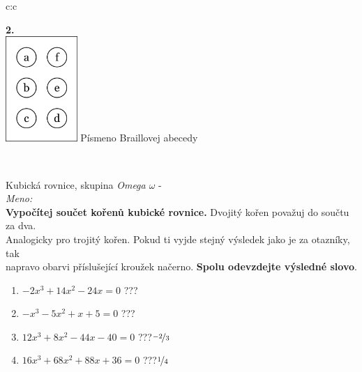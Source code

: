 \documentclass[10pt]{report}
\begin{document}
\begin{tabular}{c:c}
\begin{minipage}[c][99mm][t]{0.49\linewidth}
\begin{center}
\begin{minipage}{0.77\linewidth}
\begin{center}
\end{center}
\end{minipage}
\begin{minipage}{0.20\linewidth}
\begin{center}
{\Huge\bfseries 2.} \\[2mm]
\includegraphics[height=40mm]{../images/braille.png}
{\small Písmeno Braillovej abecedy}
\end{center}
\end{minipage}
\end{center}
\end{minipage}
\\ \hdashline
\begin{minipage}[c][99mm][t]{0.49\linewidth}
\begin{center}
\vspace{7mm}
{\huge Kubická rovnice, skupina \textit{Omega $\omega$} -}\\[4.5mm]
\textit{Meno:}\phantom{xxxxxxxxxxxxxxxxxxxxxxxxxxxxxxxxxxxxxxxxxxxxxxxxxxxxxxxxxxxxxxxxx}\\[3.5mm]
\textbf{Vypočítej součet kořenů kubické rovnice.} Dvojitý kořen považuj do součtu za dva.\\Analogicky pro trojitý kořen. Pokud ti vyjde stejný výsledek jako je za otazníky, tak\\napravo obarvi příslušející kroužek načerno. \textbf{Spolu odevzdejte výsledné slovo}.\\[3mm]
\begin{minipage}{0.77\linewidth}
\begin{center}
\begin{varwidth}{\textwidth}
\begin{enumerate}
\large
\item $-2x^3+14x^2-24x=0$\quad \dotfill\; ???\;\dotfill {}
\item $-x^3-5x^2+x+5=0$\quad \dotfill\; ???\;\dotfill {}
\item $12x^3+8x^2-44x-40=0$\quad \dotfill\; ???\;\dotfill \quad $\nicefrac{-2}{3}$
\item $16x^3+68x^2+88x+36=0$\quad \dotfill\; ???\;\dotfill \quad $\nicefrac{1}{4}$

\end{enumerate}
\end{varwidth}
\end{center}
\end{minipage}
\end{center}
\end{minipage}
\end{tabular}
\end{document}
